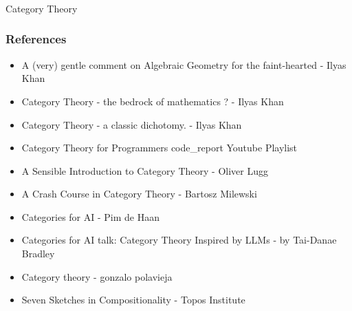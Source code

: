 \begin{frame}[fragile]\frametitle{}
\begin{center}
{\Large Category Theory}
\end{center}
\end{frame}




\begin{frame}[fragile]\frametitle{References}

\begin{itemize}
\item A (very) gentle comment on Algebraic Geometry for the faint-hearted - Ilyas Khan
\item Category Theory - the bedrock of mathematics ?  - Ilyas Khan
\item Category Theory - a classic dichotomy. - Ilyas Khan
\item Category Theory for Programmers code\_report Youtube Playlist
\item A Sensible Introduction to Category Theory - Oliver Lugg
\item A Crash Course in Category Theory - Bartosz Milewski
\item Categories for AI - Pim de Haan
\item Categories for AI talk: Category Theory Inspired by LLMs - by Tai-Danae Bradley
\item Category theory - gonzalo polavieja
\item Seven Sketches in Compositionality - Topos Institute
\end{itemize}
	  
\end{frame}